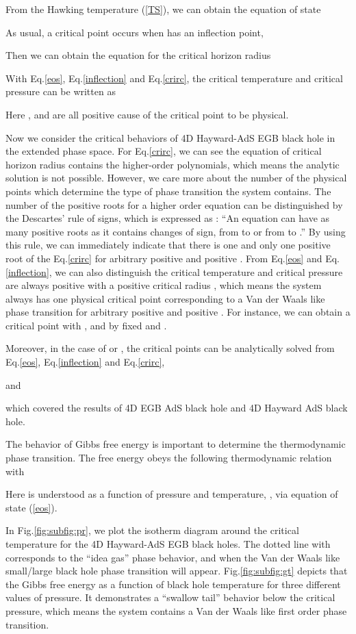 \documentclass[aps,11pt]{revtex4}
\begin{document}
From the Hawking temperature (\ref{TS}), we can obtain the equation of state

As usual, a critical point occurs when  has an inflection point,

Then we can obtain the equation for the critical horizon radius

With Eq.\ref{eos}, Eq.\ref{inflection} and Eq.\ref{crirc}, the critical temperature and critical pressure can be written as

Here ,  and  are all positive cause of the critical point to be physical.

Now we consider the critical behaviors of 4D Hayward-AdS EGB black hole in the extended phase space. For Eq.\ref{crirc}, we can see the equation of critical horizon radius contains the higher-order polynomials, which means the analytic solution is not possible. However, we care more about the number of the physical points which determine the type of phase transition the system contains. The number of the positive roots for a higher order equation can be distinguished by the Descartes' rule of signs\cite{Descartes}, which is expressed as : ``An equation can have as many positive roots as it contains changes of sign, from  to  or from  to .'' By using this rule, we can immediately indicate that there is one and only one positive root of the Eq.\ref{crirc} for arbitrary positive  and positive . From Eq.\ref{eos} and Eq.\ref{inflection}, we can also distinguish the critical temperature  and critical pressure  are always positive with a positive critical radius , which means the system always has one physical critical point corresponding to a Van der Waals like phase transition for arbitrary positive  and positive .
For instance, we can obtain a critical point with ,  and  by fixed  and .

Moreover, in the case of  or , the critical points can be analytically solved from Eq.\ref{eos}, Eq.\ref{inflection} and Eq.\ref{crirc},

and

which covered the results of 4D EGB AdS black hole\cite{Zhang:2020khz} and 4D Hayward AdS black hole\cite{Kumara:2020mvo}.

The behavior of Gibbs free energy  is important to determine the thermodynamic phase transition. The free energy  obeys the following thermodynamic relation  with

Here  is understood as a function of pressure and temperature, , via equation of state (\ref{eos}).

In Fig.\ref{fig:subfig:pr}, we plot the  isotherm diagram around the critical temperature  for the 4D Hayward-AdS EGB black holes. The dotted line with  corresponds to the ``idea gas'' phase behavior, and when  the Van der Waals like small/large black hole phase transition will appear. Fig.\ref{fig:subfig:gt} depicts that the Gibbs free energy as a function of black hole temperature for three different values of pressure. It demonstrates a ``swallow tail'' behavior below the critical pressure, which means the system contains a Van der Waals like first order phase transition.
\end{document}
